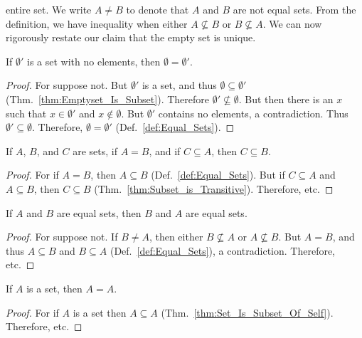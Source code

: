         entire set.
        We write $A\ne{B}$ to denote that $A$ and $B$ are not equal sets.
        From the definition, we have inequality when either
        $A\nsubseteq{B}$ or $B\nsubseteq{A}$. We can now rigorously restate
        our claim that the empty set is unique.
        \begin{theorem}
            If $\emptyset'$ is a set with no elements,
            then $\emptyset=\emptyset'$.
        \end{theorem}
        \begin{proof}
            For suppose not. But $\emptyset'$ is a set, and thus
            $\emptyset\subseteq\emptyset'$
            (Thm.~\ref{thm:Emptyset_Is_Subset}). Therefore
            $\emptyset'\nsubseteq\emptyset$. But then there is an $x$ such
            that $x\in\emptyset'$ and $x\notin\emptyset$. But $\emptyset'$
            contains no elements, a contradiction. Thus
            $\emptyset'\subseteq\emptyset$. Therefore,
            $\emptyset=\emptyset'$ (Def.~\ref{def:Equal_Sets}).
        \end{proof}
        \begin{theorem}
            \label{thm:Subsets_of_Equal_Sets}%
            If $A$, $B$, and $C$ are sets, if $A=B$, and if
            $C\subseteq{A}$, then $C\subseteq{B}$.
        \end{theorem}
        \begin{proof}
            For if $A=B$, then $A\subseteq{B}$ (Def.~\ref{def:Equal_Sets}).
            But if $C\subseteq{A}$ and $A\subseteq{B}$, then $C\subseteq{B}$
            (Thm.~\ref{thm:Subset_is_Transitive}). Therefore, etc.
        \end{proof}
        \begin{theorem}
            \label{thm:Equality_Symmetric}%
            If $A$ and $B$ are equal sets, then $B$ and
            $A$ are equal sets.
        \end{theorem}
        \begin{proof}
            For suppose not. If $B\ne{A}$, then either
            $B\nsubseteq{A}$ or $A\nsubseteq{B}$.
            But $A=B$, and thus $A\subseteq{B}$  and
            $B\subseteq{A}$ (Def.~\ref{def:Equal_Sets}),
            a contradiction. Therefore, etc.
        \end{proof}
        \begin{theorem}
            \label{thm:Equality_Reflexive}%
            If $A$ is a set, then $A=A$.
        \end{theorem}
        \begin{proof}
            For if $A$ is a set then $A\subseteq{A}$
            (Thm.~\ref{thm:Set_Is_Subset_Of_Self}).
            Therefore, etc.
        \end{proof}

